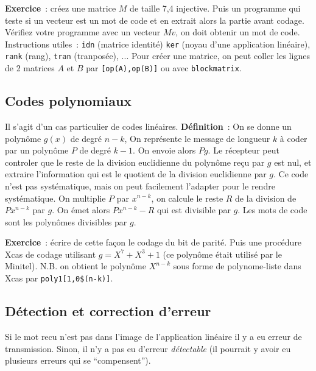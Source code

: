 \documentclass[a4paper,11pt]{book}
\begin{document}
\begin{giacjshere}
{\bf Exercice}~: créez une matrice $M$ de taille 7,4 injective. Puis
un programme qui teste si un vecteur est un mot de code et en
extrait alors la partie avant codage. Vérifiez votre programme
avec un vecteur $Mv$, on doit obtenir un mot de code.\\
Instructions utiles~: \verb|idn| (matrice identité)
\verb|ker| (noyau d'une application linéaire), \verb|rank| (rang),
\verb|tran| (tranposée), ... Pour créer une matrice, on peut coller
les lignes de 2 matrices $A$ et $B$ par \verb|[op(A),op(B)]| ou avec
\verb|blockmatrix|.

\subsection{Codes polynomiaux}
Il s'agit d'un cas particulier de codes lin\'eaires. 
{\bf Définition}~:
On se donne un polyn\^ome $g(x)$ de degr\'e $n-k$,
On repr\'esente le message de longueur $k$ \`a coder par un polyn\^ome 
$P$ de degr\'e $k-1$. On envoie alors $Pg$. Le r\'ecepteur
peut controler que le reste de la division euclidienne du polyn\^ome
re\c{c}u par $g$ est nul, et extraire l'information qui est le
quotient de la division euclidienne par $g$.
Ce code n'est pas syst\'ematique, mais on peut facilement l'adapter
pour le rendre syst\'ematique.
On multiplie $P$ par $x^{n-k}$, on calcule le reste $R$ de la division
de $P x^{n-k}$ par $g$. On \'emet alors $P x^{n-k}-R$ qui est divisible
par $g$. Les mots de code sont les polyn\^omes divisibles par $g$.

{\bf Exercice}~: écrire de cette façon le codage du bit de parité. Puis
une proc\'edure Xcas de codage utilisant $g=X^7+X^3+1$ 
(ce polynôme était utilisé par le Minitel).
N.B. on obtient le polynôme $X^{n-k}$ sous forme
de polynome-liste dans Xcas par {\tt poly1[1,0\$(n-k)]}.

\subsection{D\'etection et correction d'erreur}
 
Si le mot recu n'est pas dans l'image de l'application
lin\'eaire il y a eu erreur de transmission. Sinon, il n'y
a pas eu d'erreur {\em d\'etectable\/} (il pourrait y avoir eu plusieurs
erreurs qui se ``compensent'').


\end{giacjshere}
\end{document}
